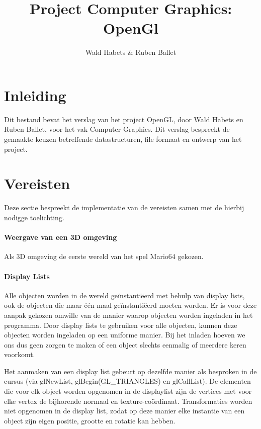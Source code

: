 \documentclass{article}
\begin{document}
\title{Project Computer Graphics: OpenGl}
\author{Wald Habets \& Ruben Ballet}
\maketitle

\section{Inleiding}
\par
Dit bestand bevat het verslag van het project OpenGL, door Wald Habets en Ruben Ballet, voor het vak Computer Graphics. Dit verslag bespreekt de gemaakte keuzen betreffende datastructuren, file formaat en ontwerp van het project.

\section{Vereisten}

Deze sectie bespreekt de implementatie van de vereisten samen met de hierbij nodigge toelichting.

\paragraph{Weergave van een 3D omgeving}Als 3D omgeving de eerste wereld van het spel Mario64 gekozen.

\paragraph{Display Lists}Alle objecten worden in de wereld geïnstantiëerd met behulp van display lists, ook de objecten die maar één maal geïnstantiëerd moeten worden. Er is voor deze aanpak gekozen omwille van de manier waarop objecten worden ingeladen in het programma. Door display lists te gebruiken voor alle objecten, kunnen deze objecten worden ingeladen op een uniforme manier. Bij het inladen hoeven we ons dus geen zorgen te maken of een object slechts eenmalig of meerdere keren voorkomt.
\par
Het aanmaken van een display list gebeurt op dezelfde manier als besproken in de cursus (via glNewList, glBegin(GL\_TRIANGLES) en glCallList). De elementen die voor elk object worden opgenomen in de displaylist zijn de vertices met voor elke vertex de bijhorende normaal en texture-coördinaat. Transformaties worden niet opgenomen in de display list, zodat op deze manier elke instantie van een object zijn eigen positie, grootte en rotatie kan hebben.
\end{document}
